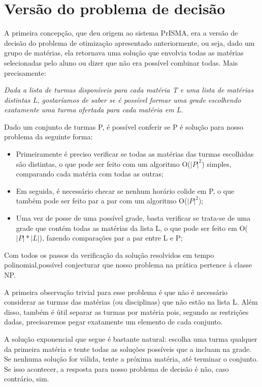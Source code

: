 \documentclass[graduacao,brazil]{ThesisPUC}
\begin{document}
\section{Versão do problema de decisão}

A primeira concepção, que deu origem ao sistema PrISMA, era a versão de decisão do problema de otimização apresentado anteriormente, ou seja, dado um grupo de matérias, ela retornava uma solução que envolvia todas as matérias selecionadas pelo aluno ou dizer que não era possível combinar todas. Mais precisamente:

\vspace{3 mm}
\textit{Dada a lista de turmas disponíveis para cada matéria T e uma lista de matérias distintas L, gostaríamos de saber se é possível formar uma grade escolhendo exatamente uma turma ofertada para cada matéria em L.}
\vspace{3 mm}

Dado um conjunto de turmas P, é possível conferir se P é solução para nosso problema da seguinte forma:

\begin{itemize}
	\item Primeiramente é preciso verificar se todas as matérias das turmas escolhidas são distintas, o que pode ser feito com um algoritmo O($|P|^2$) simples, comparando cada matéria com todas as outras;
	\item Em seguida, é necessário checar se nenhum horário colide em P, o que também pode ser feito par a par com um algoritmo O($|P|^2$);
	\item Uma vez de posse de uma possível grade, basta verificar se trata-se de uma grade que contém todas as matérias da lista L, o que pode ser feito em O($|P|*|L|$), fazendo comparações par a par entre L e P;
\end{itemize}

Com todos os passos da verificação da solução resolvidos em tempo polinomial,possível conjecturar que nosso problema na prática pertence à classe NP.

A primeira observação trivial para esse problema é que não é necessário considerar as turmas das matérias (ou disciplinas) que não estão na lista L. Além disso, também é útil separar as turmas por matéria pois, segundo as restrições dadas, precisaremos pegar exatamente um elemento de cada conjunto.

A solução exponencial que segue é bastante natural: escolha uma turma qualquer da primeira matéria e tente todas as soluções possíveis que a incluam na grade. Se nenhuma solução for válida, tente a próxima matéria, até terminar o conjunto. Se isso acontecer, a resposta para nosso problema de decisão é não, caso contrário, sim.
\end{document}
